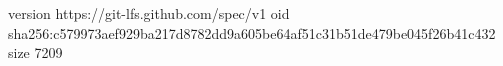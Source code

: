version https://git-lfs.github.com/spec/v1
oid sha256:c579973aef929ba217d8782dd9a605be64af51c31b51de479be045f26b41c432
size 7209
